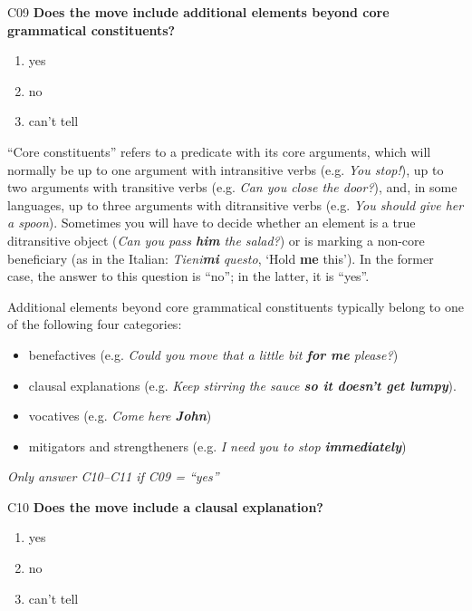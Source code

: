 \documentclass[output=paper]{langsci/langscibook}
\begin{document}
\begin{description}
\item
C09  \textbf{Does the move include additional elements beyond core grammatical constituents?}

\begin{enumerate}
\item{yes}
\item {no}
\item {can’t tell}
\end{enumerate}

“Core constituents” refers to a predicate with its core arguments, which will normally be up to one argument with intransitive verbs (e.g. \textit{You stop!}), up to two arguments with transitive verbs (e.g. \textit{Can you close the door?}), and, in some languages, up to three arguments with ditransitive verbs (e.g. \textit{You should give her a spoon}). Sometimes you will have to decide whether an element is a true ditransitive object (\textit{Can you pass \textbf{him} the salad?}) or is marking a non-core beneficiary (as in the Italian: \textit{Tieni\textbf{mi} questo}, ‘Hold \textbf{me} this’). In the former case, the answer to this question is “no”; in the latter, it is “yes”.

  Additional elements beyond core grammatical constituents typically belong to one of the following four categories:

\begin{itemize}
\item benefactives (e.g. \textit{Could you move that a little bit \textbf{for me} please?})
\item clausal explanations (e.g. \textit{Keep stirring the sauce \textbf{so it doesn’t get lumpy}}).
\item vocatives (e.g. \textit{Come here \textbf{John}})
\item mitigators and strengtheners (e.g. \textit{I need you to stop \textbf{immediately}})
\end{itemize}

\smallskip

\item
\textit{Only answer C10--C11 if C09 = “yes”}

\item
C10  \textbf{Does the move include a clausal explanation?}
\begin{enumerate}
\item{yes}
\item {no}
\item {can’t tell}
\end{enumerate}


\end{description}
\end{document}
